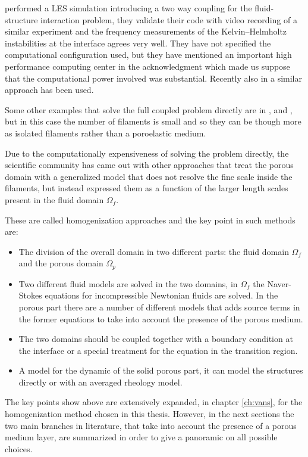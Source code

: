 \citet{dupont2010modelling} performed a LES simulation introducing a two way coupling for the fluid-structure interaction problem, they validate their code with video recording of a similar experiment and the frequency measurements of the Kelvin–Helmholtz instabilities at the interface agrees very well.
They have not specified the computational configuration used, but they have mentioned an important high performance computing center in the acknowledgment which made us suppose that the computational power involved was substantial.
Recently also in \citet{marjoribanks2017does} a similar approach has been used.

Some other examples that solve the full coupled problem directly are in \citet{pinelli2017pelskin}, \citet{favier2017pelskin} and \citet{revell2017pelskin}, but in this case the number of filaments is small and so they can be though more as isolated filaments rather than a poroelastic medium.

Due to the computationally expensiveness of solving the problem directly, the scientific community has came out with other approaches that treat the porous domain with a generalized model that does not resolve the fine scale inside the filaments, but instead expressed them as a function of the larger length scales present in the fluid domain $\Omega_{f}$.

These are called homogenization approaches and the key point in such methods are:
\begin{itemize}
	\item The division of the overall domain in two different parts: the fluid domain $\Omega_{f}$ and the porous domain $\Omega_{p}$
	\item Two different fluid models are solved in the two domains, in $\Omega_{f}$ the Naver-Stokes equations for incompressible Newtonian fluids are solved. In the porous part there are a number of different models that adds source terms in the former equations to take into account the presence of the porous medium.
	\item The two domains should be coupled together with a boundary condition at the interface or a special treatment for the equation in the transition region.
	\item A model for the dynamic of the solid porous part, it can model the structures directly or with an averaged rheology model.
\end{itemize}

The key points show above are extensively expanded, in chapter \ref{ch:vans}, for the homogenization method chosen in this thesis.
However, in the next sections the two main branches in literature, that take into account the presence of a porous medium layer, are summarized in order to give a panoramic on all possible choices.


